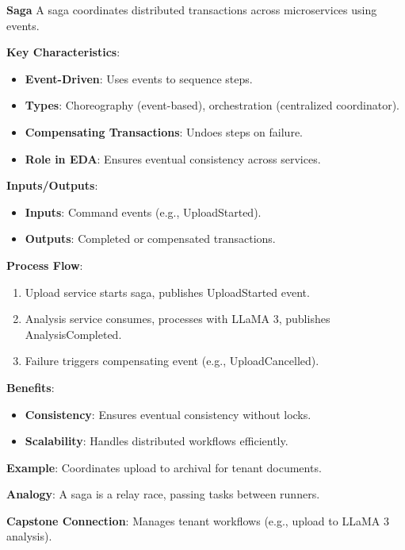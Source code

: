 \documentclass[11pt]{article}
\begin{document}
\begin{glossaryterm}
\textbf{Saga}\newline
A saga coordinates distributed transactions across microservices using events.

\textbf{Key Characteristics}:
\begin{itemize}
    \item \textbf{Event-Driven}: Uses events to sequence steps.
    \item \textbf{Types}: Choreography (event-based), orchestration (centralized coordinator).
    \item \textbf{Compensating Transactions}: Undoes steps on failure.
    \item \textbf{Role in EDA}: Ensures eventual consistency across services.
\end{itemize}

\textbf{Inputs/Outputs}:
\begin{itemize}
    \item \textbf{Inputs}: Command events (e.g., UploadStarted).
    \item \textbf{Outputs}: Completed or compensated transactions.
\end{itemize}

\textbf{Process Flow}:
\begin{enumerate}
    \item Upload service starts saga, publishes UploadStarted event.
    \item Analysis service consumes, processes with LLaMA 3, publishes AnalysisCompleted.
    \item Failure triggers compensating event (e.g., UploadCancelled).
\end{enumerate}

\textbf{Benefits}:
\begin{itemize}
    \item \textbf{Consistency}: Ensures eventual consistency without locks.
    \item \textbf{Scalability}: Handles distributed workflows efficiently.
\end{itemize}

\textbf{Example}: Coordinates upload to archival for tenant documents.

\textbf{Analogy}: A saga is a relay race, passing tasks between runners.

\textbf{Capstone Connection}: Manages tenant workflows (e.g., upload to LLaMA 3 analysis).
\end{glossaryterm}
\end{document}
